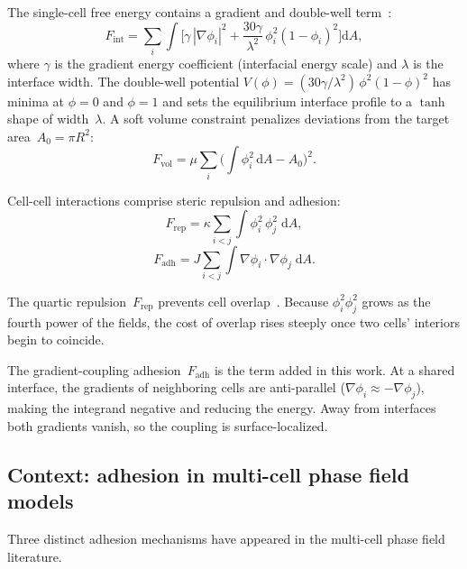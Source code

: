 \documentclass[aps,pre,twocolumn,superscriptaddress,longbibliography,floatfix]{revtex4-2}
\newcommand{\dd}{\mathrm{d}}               %
\newcommand{\phii}{\phi_i}                 %
\newcommand{\phij}{\phi_j}                 %
\begin{document}
The single-cell free energy contains a gradient and double-well
term~\cite{Palmieri2015}:
%
\begin{equation}
  F_{\mathrm{int}} = \sum_i \int \biggl[
    \gamma \, |\nabla\phii|^2
    + \frac{30\gamma}{\lambda^2}\,\phii^2(1-\phii)^2
  \biggr] \dd A,
  \label{eq:F-int}
\end{equation}
%
where $\gamma$ is the gradient energy coefficient (interfacial energy
scale) and $\lambda$ is the interface width.  The double-well potential
$V(\phi) = (30\gamma/\lambda^2)\,\phi^2(1-\phi)^2$ has minima at
$\phi = 0$ and $\phi = 1$ and sets the equilibrium interface profile to
a $\tanh$ shape of width~$\lambda$.  A soft volume constraint penalizes
deviations from the target area~$A_0 = \pi R^2$:
%
\begin{equation}
  F_{\mathrm{vol}} = \mu \sum_i
    \biggl(\int \phii^2 \, \dd A - A_0\biggr)^{\!2}.
  \label{eq:F-vol}
\end{equation}

Cell-cell interactions comprise steric repulsion and adhesion:
%
\begin{equation}
  F_{\mathrm{rep}} = \kappa \sum_{i<j} \int \phii^2\,\phij^2 \; \dd A,
  \label{eq:F-rep}
\end{equation}
%
\begin{equation}
  F_{\mathrm{adh}} = J \sum_{i<j} \int
    \nabla\phii \cdot \nabla\phij \; \dd A.
  \label{eq:F-adh}
\end{equation}

The quartic repulsion~$F_{\mathrm{rep}}$ prevents cell
overlap~\cite{Nonomura2012,Palmieri2015}.  Because $\phii^2\phij^2$ grows
as the fourth power of the fields, the cost of overlap rises steeply once
two cells' interiors begin to coincide.

The gradient-coupling adhesion~$F_{\mathrm{adh}}$ is the term added
in this work.  At a shared interface, the gradients of neighboring
cells are anti-parallel ($\nabla\phii \approx -\nabla\phij$), making
the integrand negative and reducing the energy.  Away from interfaces
both gradients vanish, so the coupling is surface-localized.

\subsection{Context: adhesion in multi-cell phase field models}
\label{sec:model:literature}

Three distinct adhesion mechanisms have appeared in the multi-cell phase
field literature.
\end{document}
